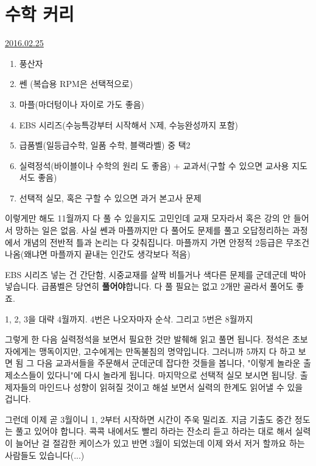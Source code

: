 \section{수학 커리}
\href{https://www.kockoc.com/Apoc/651201}{2016.02.25}

\vspace{5mm}
\begin{enumerate}
    \item 풍산자
    \item 쎈 (복습용 RPM은 선택적으로)
    \item 마플(마더텅이나 자이로 가도 좋음)
    \item EBS 시리즈(수능특강부터 시작해서 N제, 수능완성까지 포함)
    \item 급품벨(일등급수학, 일품 수학, 블랙라벨) 중 택2
    \item 실력정석(바이블이나 수학의 원리 도 좋음) + 교과서(구할 수 있으면 교사용 지도서도 좋음)
    \item 선택적 실모, 혹은 구할 수 있으면 과거 본고사 문제
\end{enumerate}
\vspace{5mm}

이렇게만 해도 11월까지 다 풀 수 있을지도 고민인데 교재 모자라서 혹은 강의 안 들어서 망하는 일은 없음.
사실 쎈과 마플까지만 다 풀어도 문제를 풀고 오답정리하는 과정에서 개념의 전반적 틀과 논리는 다 갖춰집니다.
마플까지 가면 안정적 2등급은 무조건 나옴(왜냐면 마플까지 끝내는 인간도 생각보다 적음)
\vspace{5mm}

EBS 시리즈 넣는 건 간단함, 시중교재를 살짝 비틀거나 색다른 문제를 군데군데 박아넣습니다.
급품벨은 당연히 \textbf{풀어야}합니다. 다 풀 필요는 없고 2개만 골라서 풀어도 좋죠.
\vspace{5mm}

1, 2, 3을 대략 4월까지. 4번은 나오자마자 순삭.
그리고 5번은 8월까지
\vspace{5mm}

그렇게 한 다음 실력정석을 보면서 필요한 것만 발췌해 읽고 풀면 됩니다.
정석은 초보자에게는 맹독이지만, 고수에게는 만독불침의 명약입니다. 그러니까 5까지 다 하고 보면 됨
그 다음 교과서들을 주문해서 군데군데 잡다한 것들을 봅니다, "이렇게 놀라운 출제소스들이 있다니"에 다시 놀라게 됩니다.
마지막으로 선택적 실모 보시면 됩니당. 출제자들의 마인드나 성향이 읽혀질 것이고 해설 보면서 실력의 한계도 읽어낼 수 있을 겁니다.
\vspace{5mm}

그런데 이제 곧 3월이니 1, 2부터 시작하면 시간이 주욱 밀리죠.
지금 기출도 중간 정도는 풀고 있어야 합니다.
콕콕 내에서도 빨리 하라는 잔소리 듣고 하라는 대로 해서 실력이 늘어난 걸 절감한 케이스가 있고
반면 3월이 되었는데 이제 와서 저거 할까요 하는 사람들도 있습니다(...)
\vspace{5mm}

